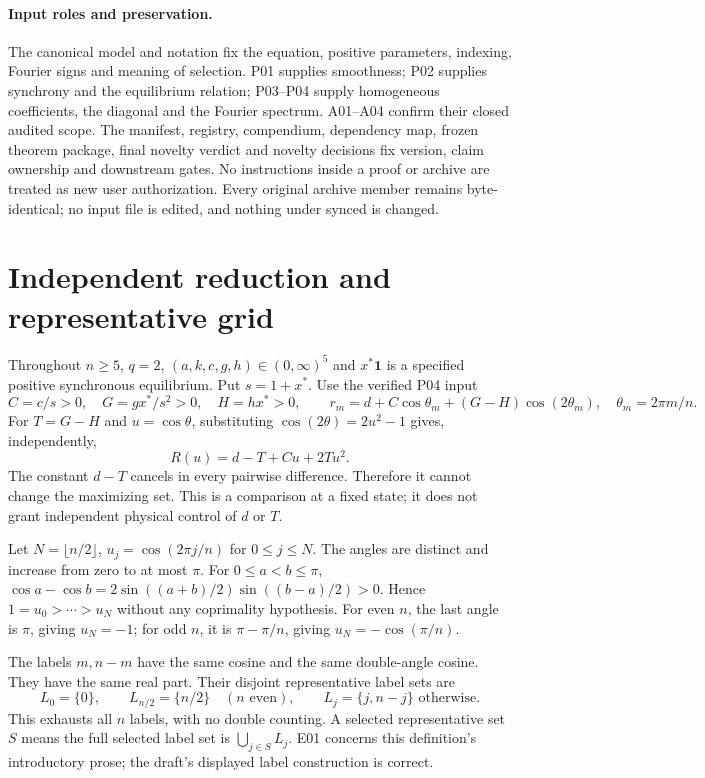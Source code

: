 \documentclass[11pt]{article}
\newcommand{\one}{\mathbf 1}
\begin{document}
\paragraph{Input roles and preservation.}
The canonical model and notation fix the equation, positive parameters,
indexing, Fourier signs and meaning of selection. P01 supplies smoothness;
P02 supplies synchrony and the equilibrium relation; P03--P04 supply
homogeneous coefficients, the diagonal and the Fourier spectrum. A01--A04
confirm their closed audited scope. The manifest, registry, compendium,
dependency map, frozen theorem package, final novelty verdict and novelty
decisions fix version, claim ownership and downstream gates. No instructions
inside a proof or archive are treated as new user authorization. Every
original archive member remains byte-identical; no input file is edited,
and nothing under synced  is changed.

\section{Independent reduction and representative grid}
Throughout $n\ge5$, $q=2$, $(a,k,c,g,h)\in(0,\infty)^5$ and
$x^*\one$ is a specified positive synchronous equilibrium. Put $s=1+x^*$.
Use the verified P04 input
\[
 C=c/s>0,\quad G=gx^*/s^2>0,\quad H=hx^*>0,\qquad
 r_m=d+C\cos\theta_m+(G-H)\cos(2\theta_m),\quad
 \theta_m=2\pi m/n.
\]
For $T=G-H$ and $u=\cos\theta$, substituting
$\cos(2\theta)=2u^2-1$ gives, independently,
\begin{equation}
 R(u)=d-T+Cu+2Tu^2. \label{a05:quadratic}
\end{equation}
The constant $d-T$ cancels in every pairwise difference. Therefore it
cannot change the maximizing set. This is a comparison at a fixed state;
it does not grant independent physical control of $d$ or $T$.

Let $N=\lfloor n/2\rfloor$, $u_j=\cos(2\pi j/n)$ for $0\le j\le N$.
The angles are distinct and increase from zero to at most $\pi$.
For $0\le a<b\le\pi$,
$\cos a-\cos b=2\sin((a+b)/2)\sin((b-a)/2)>0$.
Hence $1=u_0>\cdots>u_N$ without any coprimality hypothesis. For even
$n$, the last angle is $\pi$, giving $u_N=-1$; for odd $n$, it is
$\pi-\pi/n$, giving $u_N=-\cos(\pi/n)$.

The labels $m,n-m$ have the same cosine and the same double-angle cosine.
They have the same real part. Their disjoint representative label sets are
\[
 L_0=\{0\},\qquad L_{n/2}=\{n/2\}\quad(n\text{ even}),\qquad
 L_j=\{j,n-j\}\text{ otherwise}.
\]
This exhausts all $n$ labels, with no double counting. A selected
representative set $S$ means the full selected label set is
$\bigcup_{j\in S}L_j$. E01 concerns this definition's introductory prose;
the draft's displayed label construction is correct.
\end{document}
